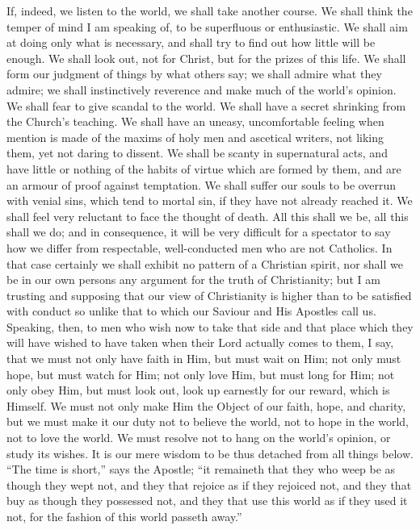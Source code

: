 If, indeed, we listen to the world, we shall take
another course. We shall think the temper of mind I am
speaking of, to be superfluous or enthusiastic. We shall
aim at doing only what is necessary, and shall try to
find out how little will be enough. We shall look out,
not for Christ, but for the prizes of this life. We shall
form our judgment of things by what others say; we shall
admire what they admire; we shall instinctively reverence
and make much of the world's opinion. We shall fear to
give scandal to the world. We shall have a secret
shrinking from the Church's teaching. We shall have an
uneasy, uncomfortable feeling when mention is made of the
maxims of holy men and ascetical writers, not liking
them, yet not daring to dissent. We shall be scanty in
supernatural acts, and have little or nothing of the
habits of virtue which are formed by them, and are an
armour of proof against temptation. We shall suffer our
souls to be overrun with venial sins, which tend to
mortal sin, if they have not already reached it. We shall
feel very reluctant to face the thought of death. All
this shall we be, all this shall we do; and in
consequence, it will be very difficult for a spectator to
say how we differ from respectable, well-conducted men
who are not Catholics. In that case certainly we shall
exhibit no pattern of a Christian spirit, nor shall we be
in our own persons any argument for the truth of
Christianity; but I am trusting and supposing that our
view of Christianity is higher than to be satisfied with
conduct so unlike that to which our Saviour and His
Apostles call us. Speaking, then, to men who wish now to
take that side and that place which they will have wished
to have taken when their Lord actually comes to them, I
say, that we must not only have faith in Him, but must
wait on Him; not only must hope, but must watch for Him;
not only love Him, but must long for Him; not only obey
Him, but must look out, look up earnestly for our reward,
which is Himself. We must not only make Him the Object of
our faith, hope, and charity, but we must make it our
duty not to believe the world, not to hope in the world,
not to love the world. We must resolve not to hang on the
world's opinion, or study its wishes. It is our mere
wisdom to be thus detached from all things below.
``The time is short,'' says the Apostle; ``it
remaineth that they who weep be as though they wept not,
and they that rejoice as if they rejoiced not, and they
that buy as though they possessed not, and they that use
this world as if they used it not, for the fashion of
this world passeth away.''

